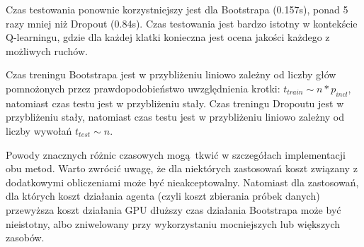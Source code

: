 Czas testowania ponownie korzystniejszy jest dla Bootstrapa (0.157s), ponad 5 razy mniej niż Dropout (0.84s). Czas testowania jest bardzo istotny w kontekście Q-learningu, gdzie dla każdej klatki konieczna jest ocena jakości każdego z możliwych ruchów.

Czas treningu Bootstrapa jest w przybliżeniu liniowo zależny od liczby głów pomnożonych przez prawdopodobieństwo uwzględnienia krotki: $t_{train}  \sim n * p_{incl}$, natomiast czas testu jest w przybliżeniu stały. Czas treningu Dropoutu jest w przybliżeniu stały, natomiast czas testu jest w przybliżeniu liniowo zależny od liczby wywołań $t_{test}  \sim n$.
 
Powody znacznych różnic czasowych mogą tkwić w szczegółach implementacji obu metod. Warto zwrócić uwagę, że dla niektórych zastosowań koszt związany z dodatkowymi obliczeniami może być nieakceptowalny. Natomiast dla zastosowań, dla których koszt działania agenta (czyli koszt zbierania próbek danych) przewyższa koszt działania GPU dłuższy czas działania Bootstrapa może być nieistotny, albo zniwelowany przy wykorzystaniu mocniejszych lub większych zasobów. 

